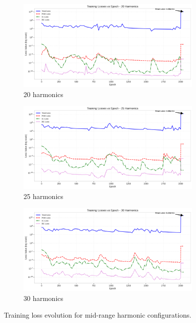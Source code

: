 \begin{figure}[H]
    \centering
    \begin{subfigure}[b]{0.32\textwidth}
        \centering
        \includegraphics[width=\textwidth]{figures/training_losses_20h.png}
        \caption{20 harmonics}
    \end{subfigure}
    \hfill
    \begin{subfigure}[b]{0.32\textwidth}
        \centering
        \includegraphics[width=\textwidth]{figures/training_losses_25h.png}
        \caption{25 harmonics}
    \end{subfigure}
    \hfill
    \begin{subfigure}[b]{0.32\textwidth}
        \centering
        \includegraphics[width=\textwidth]{figures/training_losses_30h.png}
        \caption{30 harmonics}
    \end{subfigure}
    \caption{Training loss evolution for mid-range harmonic configurations.}
    \label{fig:training_mid}
\end{figure}

